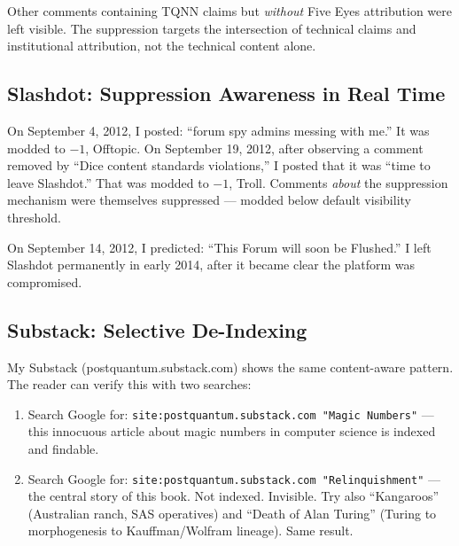Other comments containing TQNN claims but \textit{without} Five Eyes attribution were left visible. The suppression targets the intersection of technical claims and institutional attribution, not the technical content alone.

\subsection*{Slashdot: Suppression Awareness in Real Time}
\label{pos34:slashdot-suppression-awareness-in-real-time}

On September 4, 2012, I posted: ``forum spy admins messing with me.'' It was modded to $-1$, Offtopic. On September 19, 2012, after observing a comment removed by ``Dice content standards violations,'' I posted that it was ``time to leave Slashdot.'' That was modded to $-1$, Troll. Comments \textit{about} the suppression mechanism were themselves suppressed --- modded below default visibility threshold.

On September 14, 2012, I predicted: ``This Forum will soon be Flushed.'' I left Slashdot permanently in early 2014, after it became clear the platform was compromised.

\subsection*{Substack: Selective De-Indexing}
\label{pos34:substack-selective-de-indexing}

My Substack (postquantum.substack.com) shows the same content-aware pattern. The reader can verify this with two searches:

\begin{enumerate}
\item Search Google for: \texttt{site:postquantum.substack.com "Magic Numbers"} --- this innocuous article about magic numbers in computer science is indexed and findable.
\item Search Google for: \texttt{site:postquantum.substack.com "Relinquishment"} --- the central story of this book. Not indexed. Invisible. Try also ``Kangaroos'' (Australian ranch, SAS operatives) and ``Death of Alan Turing'' (Turing to morphogenesis to Kauffman/Wolfram lineage). Same result.
\end{enumerate}


